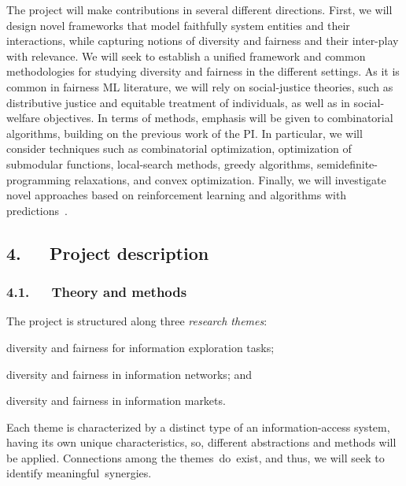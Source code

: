 \documentclass[a4paper,11pt]{article}
\begin{document}
The project will make contributions in several different directions.
First, we will design novel frameworks that model faithfully system entities and their interactions, 
while capturing notions of diversity and fairness and their inter-play with relevance.
We will seek to establish a unified framework and common methodologies for 
studying diversity and fairness in the different settings. 
As it is common in fairness ML literature, we will rely on social-justice theories, 
such as distributive justice and equitable treatment of individuals, 
as well as in social-welfare objectives. 
In terms of methods, emphasis will be given to combinatorial algorithms, 
building on the previous work of the PI. 
In particular, we will consider techniques 
such as combinatorial optimization, 
optimization of submodular functions, 
local-search methods, 
greedy algorithms, 
semidefinite-programming relaxations, and convex optimization. 
Finally, we will investigate novel 
approaches based on {reinforcement learning} and {algorithms with predictions}~\cite{mitzenmacher2022algorithms}.


\vspace{-1mm}
\subsection*{4.~~~Project description}

\vspace{-1mm}
\subsubsection*{4.1.~~~Theory and methods}
\vspace{-1mm}

The project is structured along three {\em research themes}:
\vspace{-1mm}
\begin{description}
\setlength{\itemsep}{-4pt}
\item[{\exploration}\,:] 
diversity and fairness for information exploration tasks;
\item[{\networks}\,:]
diversity and fairness in information networks; and 
\item[{\markets}\,:]
diversity and fairness in information markets.
\end{description}
\vspace{-1mm}
Each theme is characterized by a distinct type of an information-access system, 
having its own unique characteristics, 
so, different abstractions and methods will be applied. 
Connections among the themes~do~exist, 
and thus, we will seek to identify meaningful~synergies. 
\end{document}
